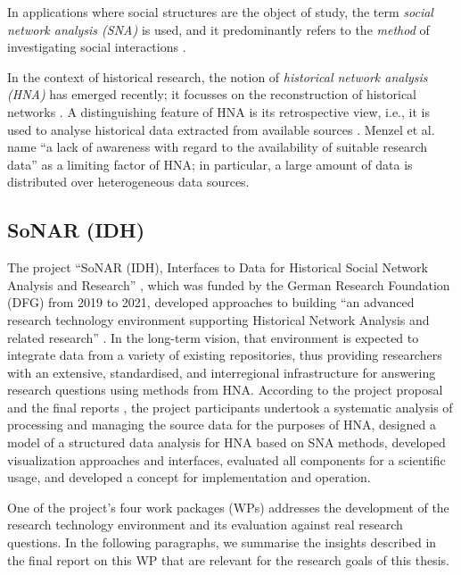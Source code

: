 In applications where social structures are the object of study,
the term \emph{social network analysis (SNA)} is used,
and it predominantly refers to the \emph{method} of investigating
social interactions \autocite{Otte2002}.

In the context of historical research,
the notion of \emph{historical network analysis (HNA)}
has emerged recently; it focusses on the reconstruction of
historical networks \autocite{Menzel2020}.
A distinguishing feature of HNA is its retrospective view,
i.e., it is used to analyse historical data extracted
from available sources \autocite{Fangerau2022}.
Menzel et al.\ \autocite*{Menzel2020} name
\enquote{a lack of awareness with regard to the availability of suitable research data}
as a limiting factor of HNA;
in particular, a large amount of data is distributed over heterogeneous data sources.

\subsection{SoNAR (IDH)}

The project \enquote{SoNAR (IDH),
Interfaces to Data for Historical Social Network Analysis
and Research} \autocite{Bludau2020,Menzel2020,SoNAR},
which was funded by the German Research Foundation (DFG)
from 2019 to 2021,
developed approaches to building 
\enquote{an advanced research technology environment
supporting Historical Network Analysis and related research} \autocite{SoNAR}.
In the long-term vision, that environment is expected to
integrate data from a variety of existing repositories,
thus providing researchers with an extensive,
standardised, and interregional infrastructure for answering research questions
using methods from HNA.
According to the project proposal and the final reports \autocite{SoNARreports},
the project participants undertook
a systematic analysis of processing and managing the source data
for the purposes of HNA,
designed a model of a structured data analysis for HNA based on SNA methods,
developed visualization approaches and interfaces,
evaluated all components for a scientific usage,
and developed a concept for implementation and operation.

One of the project's four work packages (WPs)
addresses the development of the research technology environment
and its evaluation against real research questions.
In the following paragraphs,
we summarise the insights described in the final report on this WP \autocite{Fangerau2022}
that are relevant for the research goals of this thesis.

